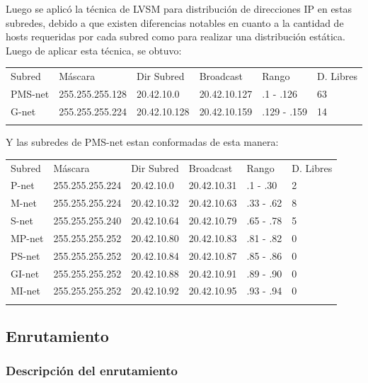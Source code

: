 Luego se aplicó la técnica de LVSM para distribución de direcciones IP
en estas subredes, debido a que existen diferencias notables en cuanto a
la cantidad de hosts requeridas por cada subred como para realizar una
distribución estática. Luego de aplicar esta técnica, se obtuvo:

\begin{longtable}[c]{@{}llllll@{}}
\toprule\addlinespace
Subred & Máscara & Dir Subred & Broadcast & Rango & D. Libres
\\\addlinespace
\midrule\endhead
PMS-net & 255.255.255.128 & 20.42.10.0 & 20.42.10.127 & .1 - .126 & 63
\\\addlinespace
G-net & 255.255.255.224 & 20.42.10.128 & 20.42.10.159 & .129 - .159 & 14
\\\addlinespace
\bottomrule
\end{longtable}

Y las subredes de PMS-net estan conformadas de esta manera:

\begin{longtable}[c]{@{}llllll@{}}
\toprule\addlinespace
Subred & Máscara & Dir Subred & Broadcast & Rango & D. Libres
\\\addlinespace
\midrule\endhead
P-net & 255.255.255.224 & 20.42.10.0 & 20.42.10.31 & .1 - .30 & 2
\\\addlinespace
M-net & 255.255.255.224 & 20.42.10.32 & 20.42.10.63 & .33 - .62 & 8
\\\addlinespace
S-net & 255.255.255.240 & 20.42.10.64 & 20.42.10.79 & .65 - .78 & 5
\\\addlinespace
MP-net & 255.255.255.252 & 20.42.10.80 & 20.42.10.83 & .81 - .82 & 0
\\\addlinespace
PS-net & 255.255.255.252 & 20.42.10.84 & 20.42.10.87 & .85 - .86 & 0
\\\addlinespace
GI-net & 255.255.255.252 & 20.42.10.88 & 20.42.10.91 & .89 - .90 & 0
\\\addlinespace
MI-net & 255.255.255.252 & 20.42.10.92 & 20.42.10.95 & .93 - .94 & 0
\\\addlinespace
\bottomrule
\end{longtable}

\subsection{Enrutamiento}\label{enrutamiento}

\subsubsection{Descripción del
enrutamiento}\label{descripciuxf3n-del-enrutamiento}

